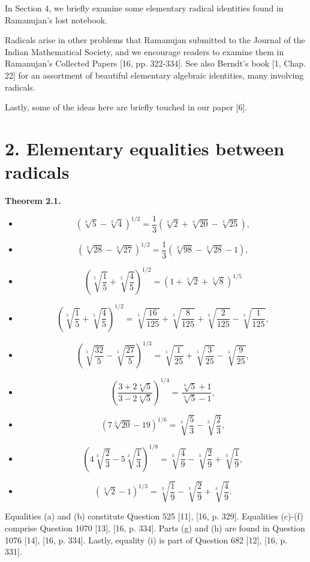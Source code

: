 \documentclass[11pt,letterpaper]{article}
\begin{document}
In Section 4, we briefly examine some elementary radical identities found in Ramanujan's lost notebook.

Radicals arise in other problems that Ramanujan submitted to the Journal of the Indian Mathematical Society, and we encourage readers to examine them in Ramanujan's Collected Papers [16, pp. 322-334]. See also Berndt's book [1, Chap. 22] for an assortment of beautiful elementary algebraic identities, many involving radicals.

Lastly, some of the ideas here are briefly touched in our paper [6].

\section*{2. Elementary equalities between radicals}
\noindent\textbf{Theorem 2.1.}

\begin{itemize}
  \item[(a)] \[
(\sqrt[3]{5}-\sqrt[3]{4})^{1 / 2}=\frac{1}{3}(\sqrt[3]{2}+\sqrt[3]{20}-\sqrt[3]{25}),
\]
  \item[(b)] \[
(\sqrt[3]{28}-\sqrt[3]{27})^{1 / 2}=\frac{1}{3}(\sqrt[3]{98}-\sqrt[3]{28}-1),
\]
  \item[(c)] \[
\left(\sqrt[5]{\frac{1}{5}}+\sqrt[5]{\frac{4}{5}}\right)^{1 / 2}=(1+\sqrt[5]{2}+\sqrt[5]{8})^{1 / 5}
\]
  \item[(d)] \[
\left(\sqrt[5]{\frac{1}{5}}+\sqrt[5]{\frac{4}{5}}\right)^{1 / 2}=\sqrt[5]{\frac{16}{125}}+\sqrt[5]{\frac{8}{125}}+\sqrt[5]{\frac{2}{125}}-\sqrt[5]{\frac{1}{125}},
\]
  \item[(e)] \[
\left(\sqrt[5]{\frac{32}{5}}-\sqrt[5]{\frac{27}{5}}\right)^{1 / 3}=\sqrt[5]{\frac{1}{25}}+\sqrt[5]{\frac{3}{25}}-\sqrt[5]{\frac{9}{25}},
\]
  \item[(f)] \[
\left(\frac{3+2 \sqrt[4]{5}}{3-2 \sqrt[4]{5}}\right)^{1 / 4}=\frac{\sqrt[4]{5}+1}{\sqrt[4]{5}-1},
\]
  \item[(g)] \[
(7 \sqrt[3]{20}-19)^{1 / 6}=\sqrt[3]{\frac{5}{3}}-\sqrt[3]{\frac{2}{3}},
\]
  \item[(h)] \[
\left(4 \sqrt[3]{\frac{2}{3}}-5 \sqrt[3]{\frac{1}{3}}\right)^{1 / 8}=\sqrt[3]{\frac{4}{9}}-\sqrt[3]{\frac{2}{9}}+\sqrt[3]{\frac{1}{9}},
\]
  \item[(i)] \[
(\sqrt[3]{2}-1)^{1 / 3}=\sqrt[3]{\frac{1}{9}}-\sqrt[3]{\frac{2}{9}}+\sqrt[3]{\frac{4}{9}} .
\]
\end{itemize}

Equalities (a) and (b) constitute Question 525 [11], [16, p. 329]. Equalities (c)-(f) comprise Question 1070 [13], [16, p. 334]. Parts (g) and (h) are found in Question 1076 [14], [16, p. 334]. Lastly, equality (i) is part of Question 682 [12], [16, p. 331].
\end{document}
